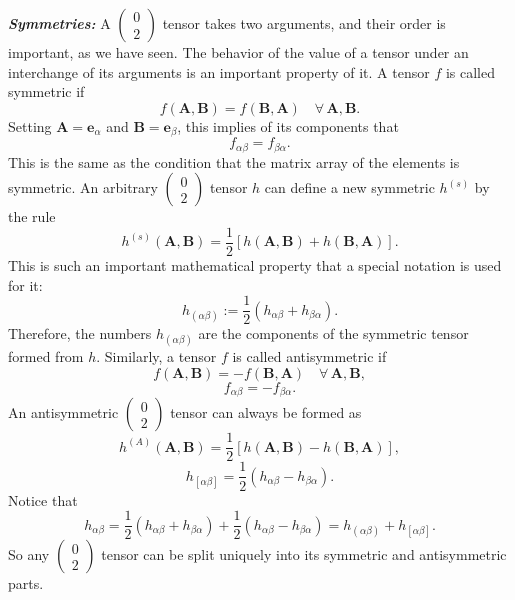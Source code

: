 \documentclass[12pt]{book}
\begin{document}
    \textit{\textbf{Symmetries:}} A \(\left(\begin{array}{c} 0 \\ 2 \end{array}\right)\) tensor takes two arguments, and their order is important, as we have seen. The behavior of the value of a tensor under an interchange of its arguments is an important property of it. A tensor \(f\) is called symmetric if
    \[
    f(\mathbf{A},\mathbf{B}) = f(\mathbf{B},\mathbf{A}) \quad \forall \, \mathbf{A}, \mathbf{B}. \tag{3.27}
    \]
    Setting \(\mathbf{A} = \mathbf{e}_\alpha\) and \(\mathbf{B} = \mathbf{e}_\beta\), this implies of its components that
    \[
    f_{\alpha\beta} = f_{\beta\alpha}. \tag{3.28}
    \]
    This is the same as the condition that the matrix array of the elements is symmetric. An arbitrary \(\left(\begin{array}{c} 0 \\ 2 \end{array}\right)\) tensor \(h\) can define a new symmetric \(h^{(s)}\) by the rule
    \[
    h^{(s)}(\mathbf{A},\mathbf{B}) = \frac{1}{2} \left[ h(\mathbf{A},\mathbf{B}) + h(\mathbf{B},\mathbf{A}) \right]. \tag{3.29}
    \]
    This is such an important mathematical property that a special notation is used for it:
    \[
    h_{(\alpha\beta)} := \frac{1}{2} \left( h_{\alpha\beta} + h_{\beta\alpha} \right). \tag{3.31}
    \]
    Therefore, the numbers \(h_{(\alpha\beta)}\) are the components of the symmetric tensor formed from \(h\).
    Similarly, a tensor \(f\) is called antisymmetric if
    \[
    f(\mathbf{A},\mathbf{B}) = -f(\mathbf{B},\mathbf{A}) \quad \forall \, \mathbf{A}, \mathbf{B}, \tag{3.32}
    \]
    \[
    f_{\alpha\beta} = -f_{\beta\alpha}. \tag{3.33}
    \]
    An antisymmetric \(\left(\begin{array}{c} 0 \\ 2 \end{array}\right)\) tensor can always be formed as
    \[
    h^{(A)}(\mathbf{A},\mathbf{B}) = \frac{1}{2} \left[ h(\mathbf{A},\mathbf{B}) - h(\mathbf{B},\mathbf{A}) \right],
    \]
    \[
    h_{[\alpha\beta]} = \frac{1}{2} \left( h_{\alpha\beta} - h_{\beta\alpha} \right). \tag{3.34}
    \]
    Notice that
    \[
    h_{\alpha\beta} = \frac{1}{2} \left( h_{\alpha\beta} + h_{\beta\alpha} \right) + \frac{1}{2} \left( h_{\alpha\beta} - h_{\beta\alpha} \right)
    = h_{(\alpha\beta)} + h_{[\alpha\beta]}. \tag{3.35}
    \]
    So any \(\left(\begin{array}{c} 0 \\ 2 \end{array}\right)\) tensor can be split uniquely into its symmetric and antisymmetric parts.
    
\end{document}
